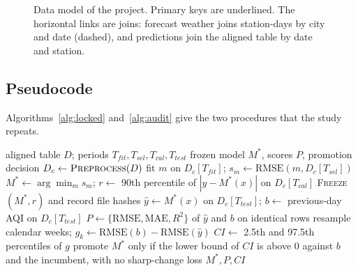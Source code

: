 \documentclass[pdflatex,sn-mathphys-num]{sn-jnl}
\begin{document}
\begin{figure}[!htbp]
{}
\caption{Data model of the project. Primary keys are underlined. The horizontal links are joins: forecast weather joins station-days by city and date (dashed), and predictions join the aligned table by date and station.}\label{fig:database}
\end{figure}


\subsection{Pseudocode}
Algorithms~\ref{alg:locked} and~\ref{alg:audit} give the two procedures that the study repeats.

\begin{algorithm}[!htbp]
\caption{Locked forecast evaluation}\label{alg:locked}
\begin{algorithmic}[1]
\Require aligned table $D$; periods $T_{fit}, T_{sel}, T_{cal}, T_{test}$
\Ensure frozen model $M^{\ast}$, scores $P$, promotion decision
\State $D_c \gets \textsc{Preprocess}(D)$ 
  \State fit $m$ on $D_c[T_{fit}]$; $s_m \gets \mathrm{RMSE}(m, D_c[T_{sel}])$
\EndFor
\State $M^{\ast} \gets \arg\min_m s_m$; $r \gets$ 90th percentile of $|y - M^{\ast}(x)|$ on $D_c[T_{cal}]$
\State \textsc{Freeze}$(M^{\ast}, r)$ and record file hashes
\State $\hat{y} \gets M^{\ast}(x)$ on $D_c[T_{test}]$; $b \gets$ previous-day AQI on $D_c[T_{test}]$
\State $P \gets \{\mathrm{RMSE}, \mathrm{MAE}, R^2\}$ of $\hat{y}$ and $b$ on identical rows
  \State resample calendar weeks; $g_k \gets \mathrm{RMSE}(b) - \mathrm{RMSE}(\hat{y})$
\EndFor
\State $CI \gets$ 2.5th and 97.5th percentiles of $g$
\State promote $M^{\ast}$ only if the lower bound of $CI$ is above 0 against $b$ and the incumbent, with no sharp-change loss
\State \Return $M^{\ast}, P, CI$
\end{algorithmic}
\end{algorithm}
\end{document}
